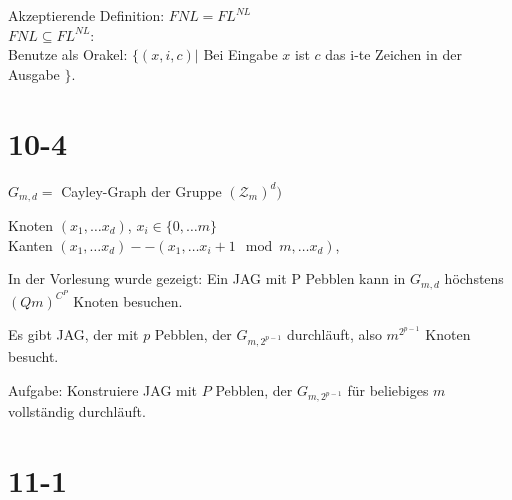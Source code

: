 \documentclass[12pt, oneside, a4paper, numbers=enddot, abstracton, parskip=full]{scrreprt}
\begin{document}
Akzeptierende Definition: $FNL = FL^{NL}$ \\
$FNL\subseteq FL^{NL}$:\\
Benutze als Orakel: $\{ (x,i,c)|$ Bei Eingabe $x$ ist $c$ das i-te Zeichen in der Ausgabe $\}$.



\section{10-4}

$G_{m,d} = $ Cayley-Graph der Gruppe $(\mathcal{Z}_m)^d)$

Knoten $(x_1, \dots x_d)$, $x_i \in \{0, \dots m \}$
\\
Kanten $(x_1, \dots x_d) -- (x_1, \dots x_i + 1 \mod m, \dots x_d)$,

In der Vorlesung wurde gezeigt: Ein JAG mit P Pebblen  kann in $G_{m,d}$ höchstens $(Qm)^{C^P}$ Knoten besuchen.

Es gibt JAG, der mit $p$ Pebblen, der $G_{m,2^{p-1}}$ durchläuft, also $m^{2^{p-1}}$ Knoten besucht.

Aufgabe: Konstruiere JAG mit $P$ Pebblen, der $G_{m,2^{p-1}}$ für beliebiges $m$ vollständig durchläuft.



\section{11-1}
\end{document}
